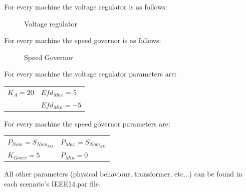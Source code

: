 \documentclass[a4paper, 12pt]{report}
\begin{document}
For every machine the voltage regulator is as follows:
\begin{figure}[H]
\centering
{}
\caption{Voltage regulator}
\end{figure}

For every machine the speed governor is as follows:
\begin{figure}[H]
\centering
{}
\caption{Speed Governor}
\end{figure}

For every machine the voltage regulator parameters are:
\begin{center}
\begin{tabular}{l|l}
   $K_A=20$ & $Efd_{Max}=5$  \\
    & $Efd_{Min}=-5$   \\
\end{tabular}
\end{center}

For every machine the speed governor parameters are:
\begin{center}
\begin{tabular}{l|l}
   $P_{Nom}=S_{Nom_{SM}}$ & $P_{Max}=S_{Nom_{SM}}$  \\
   $K_{Gover}=5$ & $P_{Min}=0$   \\
\end{tabular}
\end{center}

All other parameters (physical behaviour, transformer, etc...) can be found in each scenario's IEEE14.par file.
\end{document}

